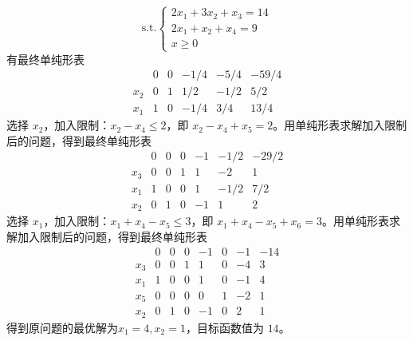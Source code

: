 $$
\text{s.t.} 
\begin{cases}
    2x_1 + 3x_2 + x_3 = 14 \\
    2x_1 + x_2 + x_4 = 9 \\
    x \ge 0
\end{cases}
$$
有最终单纯形表
$$
\begin{array}{c|cccc|c} & 0 & 0 & -1/4 & -5/4 & -59/4 \\ \hline x_2 & 0 & 1 & 1/2 & -1/2 & 5/2 \\ x_1 & 1 & 0 & -1/4 & 3/4 & 13/4 \end{array}
$$
选择 $x_2$，加入限制：$x_2 - x_4 \le 2$，即 $x_2 - x_4 + x_5 = 2$。用单纯形表求解加入限制后的问题，得到最终单纯形表
$$
\begin{array}{c|ccccc|c} & 0 & 0 & 0 & -1 & -1/2 & -29/2 \\ \hline x_3 & 0 & 0 & 1 & 1 & -2 & 1 \\ x_1 & 1 & 0 & 0 & 1 & -1/2 & 7/2 \\ x_2 & 0 & 1 & 0 & -1 & 1 & 2 \end{array}
$$
选择 $x_1$，加入限制：$x_1 + x_4 - x_5 \le 3$，即 $x_1 + x_4 - x_5 + x_6 = 3$。用单纯形表求解加入限制后的问题，得到最终单纯形表
$$
\begin{array}{c|cccccc|c} & 0 & 0 & 0 & -1 & 0 & -1 & -14 \\ \hline x_3 & 0 & 0 & 1 & 1 & 0 & -4 & 3 \\ x_1 & 1 & 0 & 0 & 1 & 0 & -1 & 4 \\ x_5 & 0 & 0 & 0 & 0 & 1 & -2 & 1 \\ x_2 & 0 & 1 & 0 & -1 & 0 & 2 & 1 \end{array}
$$
得到原问题的最优解为$x_1 = 4, x_2 = 1$​，目标函数值为 $14$。

